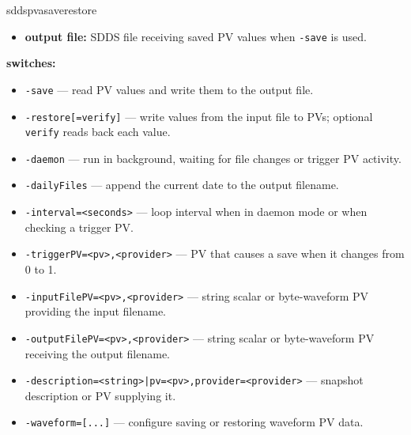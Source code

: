 \begin{sddsprog}{sddspvasaverestore}
\begin{itemize}
    Scalar restores use values from the first snapshot page; when the snapshot
    defines enum data, all remaining pages are validated before writing PVs,
    including their enum keys. Enum-free snapshots are read as before.
    A scalar row whose PV now has more than one element is reported as an
    error for that PV and the PV is not written.
    Waveform files may use SDDS6 enum columns; values are restored using their
    dictionary labels. Restores use the file's element count, including
    one-element waveforms, independently of the destination PV's capacity.
    For CA destinations, a waveform file with more elements than the PV is
    truncated to the PV's element count with a warning.
    Enum labels sent through the CA provider must fit in 39 bytes; this
    applies to scalar rows and enum waveforms. Longer labels are rejected
    before any restored values are sent. PVA destinations retain their
    existing string length support.
  \item \textbf{output file:} SDDS file receiving saved PV values when \texttt{-save} is used.
\end{itemize}
\item \textbf{switches:}
\begin{itemize}
  \item {\tt -save} --- read PV values and write them to the output file.
  \item {\tt -restore[=verify]} --- write values from the input file to PVs; optional {\tt verify} reads back each value.
  \item {\tt -daemon} --- run in background, waiting for file changes or trigger PV activity.
  \item {\tt -dailyFiles} --- append the current date to the output filename.
  \item {\tt -interval=<seconds>} --- loop interval when in daemon mode or when checking a trigger PV.
  \item {\tt -triggerPV=<pv>,<provider>} --- PV that causes a save when it changes from 0 to 1.
  \item {\tt -inputFilePV=<pv>,<provider>} --- string scalar or byte-waveform PV providing the input filename.
  \item {\tt -outputFilePV=<pv>,<provider>} --- string scalar or byte-waveform PV receiving the output filename.
  \item {\tt -description=<string>|pv=<pv>,provider=<provider>} --- snapshot description or PV supplying it.
  \item {\tt -waveform=[...]} --- configure saving or restoring waveform PV data.

\end{itemize}
\end{sddsprog}
